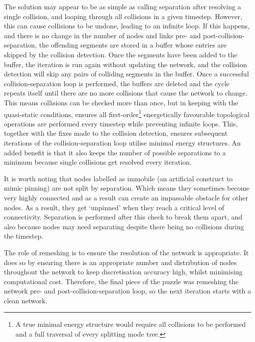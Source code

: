 The solution may appear to be as simple as calling separation after resolving a single collision, and looping through all collisions in a given timestep. However, this can cause collisions to be undone, leading to an infinite loop. If this happens, and there is no change in the number of nodes and links pre- and post-collision-separation, the offending segments are stored in a buffer whose entries are skipped by the collision detection. Once the segments have been added to the buffer, the iteration is run again without updating the network, and the collision detection will skip any pairs of colliding segments in the buffer. Once a successful collision-separation loop is performed, the buffers are deleted and the cycle repeats itself until there are no more collisions that cause the network to change. This means collisions can be checked more than once, but in keeping with the quasi-static conditions, ensures all first-order\footnote{A true minimal energy structure would require all collisions to be performed and a full traversal of every splitting mode tree.} energetically favourable topological operations are performed every timestep while preventing infinite loops. This, together with the fixes made to the collision detection, ensures subsequent iterations of the collision-separation loop utilise minimal energy structures. An added benefit is that it also keeps the number of possible separations to a minimum because single collisions get resolved every iteration.

It is worth noting that nodes labelled as immobile (an artificial construct to mimic pinning) are not split by separation. Which means they sometimes become very highly connected and as a result can create an impassable obstacle for other nodes. As a result, they get `unpinned' when they reach a critical level of connectivity. Separation is performed after this check to break them apart, and also because nodes may need separating despite there being no collisions during the timestep.

The role of remeshing is to ensure the resolution of the network is appropriate. It does so by ensuring there is an appropriate number and distribution of nodes throughout the network to keep discretisation accuracy high, whilst minimising computational cost. Therefore, the final piece of the puzzle was remeshing the network pre- and post-collision-separation loop, so the next iteration starts with a clean network.

